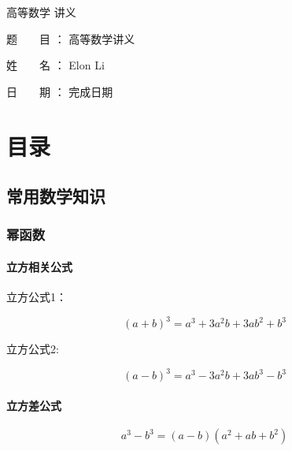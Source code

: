 \documentclass[
]{article}
\author{}
\date{}
\begin{document}
    
        
        
    
    
    
        
	
    
    高等数学
    讲义 
    
    
    
    
    	 
    		题　　目
    		： 
    		 高等数学讲义     
    	 
    		姓　　名
    		： 
    		 Elon Li     
    	 
    		日　　期
    		： 
    		完成日期     
                  
    

\hypertarget{ux76eeux5f55}{%
\section{目录}\label{ux76eeux5f55}}

\tableofcontents

\hypertarget{ux5e38ux7528ux6570ux5b66ux77e5ux8bc6}{%
\subsection{常用数学知识}\label{ux5e38ux7528ux6570ux5b66ux77e5ux8bc6}}

\hypertarget{ux5e42ux51fdux6570}{%
\subsubsection{幂函数}\label{ux5e42ux51fdux6570}}

\hypertarget{ux7acbux65b9ux76f8ux5173ux516cux5f0f}{%
\paragraph{立方相关公式}\label{ux7acbux65b9ux76f8ux5173ux516cux5f0f}}

立方公式1：

\[(a+b)^3 = a^3+3a^2b+3ab^2+b^3\]

立方公式2:

\[(a-b)^3=a^3-3a^2b+3ab^3-b^3\]

\hypertarget{ux7acbux65b9ux5deeux516cux5f0f}{%
\paragraph{立方差公式}\label{ux7acbux65b9ux5deeux516cux5f0f}}

\[a^3-b^3=(a-b)(a^2+ab+b^2)\]
\end{document}
